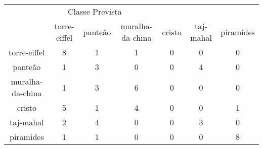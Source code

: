 \begin{tabular}{|c|c|c|c|c|c|c|}
\hline
\multicolumn{5}{|c|}{Classe Prevista}\\
 & torre-eiffel & panteão & muralha-da-china & cristo & taj-mahal & piramides\\
torre-eiffel & 8 & 1 & 1 & 0 & 0 & 0\\
panteão & 1 & 3 & 0 & 0 & 4 & 0\\
muralha-da-china & 1 & 3 & 6 & 0 & 0 & 0\\
cristo & 5 & 1 & 4 & 0 & 0 & 1\\
taj-mahal & 2 & 4 & 0 & 0 & 3 & 0\\
piramides & 1 & 1 & 0 & 0 & 0 & 8\\
\end{tabular}
